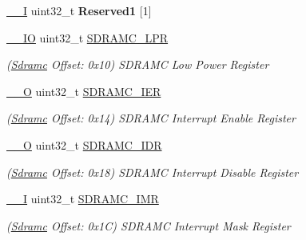 \begin{DoxyCompactItemize}
\mbox{\label{structSdramc_a0d32df6393855cb5975cd65897af5666}} 
\mbox{\hyperlink{core__cm7_8h_af63697ed9952cc71e1225efe205f6cd3}{\+\_\+\+\_\+I}} uint32\+\_\+t {\bfseries Reserved1} \mbox{[}1\mbox{]}
\item 
\mbox{\label{structSdramc_a6c382174343ce3cf18c75b9964da720a}} 
\mbox{\hyperlink{core__cm7_8h_aec43007d9998a0a0e01faede4133d6be}{\+\_\+\+\_\+\+IO}} uint32\+\_\+t \mbox{\hyperlink{structSdramc_a6c382174343ce3cf18c75b9964da720a}{S\+D\+R\+A\+M\+C\+\_\+\+L\+PR}}
\begin{DoxyCompactList}\small\item\em (\mbox{\hyperlink{structSdramc}{Sdramc}} Offset\+: 0x10) S\+D\+R\+A\+MC Low Power Register \end{DoxyCompactList}\item 
\mbox{\label{structSdramc_a3e48c0937021fe6485922f6348007dc9}} 
\mbox{\hyperlink{core__cm7_8h_a7e25d9380f9ef903923964322e71f2f6}{\+\_\+\+\_\+O}} uint32\+\_\+t \mbox{\hyperlink{structSdramc_a3e48c0937021fe6485922f6348007dc9}{S\+D\+R\+A\+M\+C\+\_\+\+I\+ER}}
\begin{DoxyCompactList}\small\item\em (\mbox{\hyperlink{structSdramc}{Sdramc}} Offset\+: 0x14) S\+D\+R\+A\+MC Interrupt Enable Register \end{DoxyCompactList}\item 
\mbox{\label{structSdramc_a796da8a069bc630a89205f92e12f795a}} 
\mbox{\hyperlink{core__cm7_8h_a7e25d9380f9ef903923964322e71f2f6}{\+\_\+\+\_\+O}} uint32\+\_\+t \mbox{\hyperlink{structSdramc_a796da8a069bc630a89205f92e12f795a}{S\+D\+R\+A\+M\+C\+\_\+\+I\+DR}}
\begin{DoxyCompactList}\small\item\em (\mbox{\hyperlink{structSdramc}{Sdramc}} Offset\+: 0x18) S\+D\+R\+A\+MC Interrupt Disable Register \end{DoxyCompactList}\item 
\mbox{\label{structSdramc_ad8aa8e0309c7fce327dd9b13194e551d}} 
\mbox{\hyperlink{core__cm7_8h_af63697ed9952cc71e1225efe205f6cd3}{\+\_\+\+\_\+I}} uint32\+\_\+t \mbox{\hyperlink{structSdramc_ad8aa8e0309c7fce327dd9b13194e551d}{S\+D\+R\+A\+M\+C\+\_\+\+I\+MR}}
\begin{DoxyCompactList}\small\item\em (\mbox{\hyperlink{structSdramc}{Sdramc}} Offset\+: 0x1C) S\+D\+R\+A\+MC Interrupt Mask Register \end{DoxyCompactList}\item 

\end{DoxyCompactItemize}
